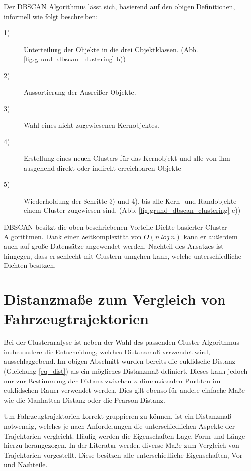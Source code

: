 Der DBSCAN Algorithmus lässt sich, basierend auf den obigen Definitionen, informell wie folgt beschreiben:

\begin{description}
    \item[1)] Unterteilung der Objekte in die drei Objektklassen. (Abb. \ref{fig:grund_dbscan_clustering} b))
    \item[2)] Aussortierung der Ausreißer-Objekte.
    \item[3)] Wahl eines nicht zugewiesenen Kernobjektes.
    \item[4)] Erstellung eines neuen Clusters für das Kernobjekt und alle von ihm ausgehend direkt oder indirekt erreichbaren Objekte
    \item[5)] Wiederholdung der Schritte 3) und 4), bis alle Kern- und Randobjekte einem Cluster zugewiesen sind. (Abb. \ref{fig:grund_dbscan_clustering} c))
\end{description}

DBSCAN besitzt die oben beschriebenen Vorteile Dichte-basierter Cluster-Algorithmen. Dank einer Zeitkomplexität
von $O(n\ log\ n)$ kann er außerdem auch auf große Datensätze angewendet werden.
Nachteil des Ansatzes ist hingegen, dass er schlecht mit Clustern umgehen kann, welche unterschiedliche Dichten besitzen.





\section{Distanzmaße zum Vergleich von Fahrzeugtrajektorien}
\label{sec:distance_measures}

Bei der Clusteranalyse ist neben der Wahl des passenden Cluster-Algorithmus insbesondere
die Entscheidung, welches Distanzmaß verwendet wird, ausschlaggebend.
Im obigen Abschnitt wurden bereits die euklidsche Distanz (Gleichung \ref{eq_dist}) als ein mögliches Distanzmaß
definiert. Dieses kann jedoch nur zur Bestimmung der Distanz zwischen $n$-dimensionalen Punkten im euklidschen Raum verwendet
werden. Dies gilt ebenso für andere einfache Maße wie die Manhatten-Distanz oder die Pearson-Distanz.

Um Fahrzeugtrajektorien korrekt gruppieren zu können, ist ein Distanzmaß notwendig, welches je nach Anforderungen
die unterschiedlichen Aspekte der Trajektorien vergleicht. Häufig werden die Eigenschaften Lage, Form und Länge
hierzu herangezogen. In der Literatur werden diverse Maße zum Vergleich von Trajektorien vorgestellt. Diese besitzen
alle unterschiedliche Eigenschaften, Vor- und Nachteile.

